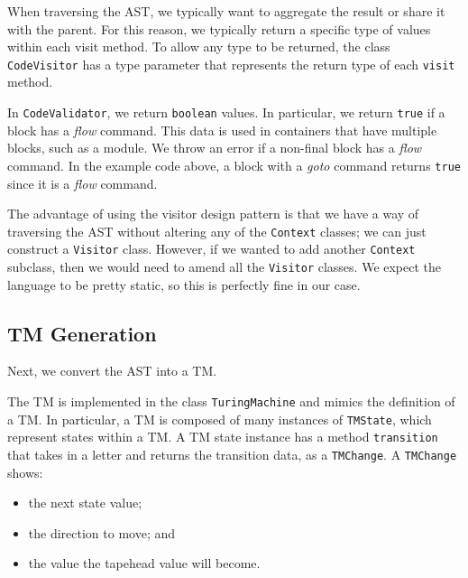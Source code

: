 When traversing the AST, we typically want to aggregate the result or share it with the parent. For this reason, we typically return a specific type of values within each visit method. To allow any type to be returned, the class \texttt{CodeVisitor} has a type parameter that represents the return type of each \texttt{visit} method.

In \texttt{CodeValidator}, we return \texttt{boolean} values. In particular, we return \texttt{true} if a block has a \textit{flow} command. This data is used in containers that have multiple blocks, such as a module. We throw an error if a non-final block has a \textit{flow} command. In the example code above, a block with a \textit{goto} command returns \texttt{true} since it is a \textit{flow} command. 


The advantage of using the visitor design pattern is that we have a way of traversing the AST without altering any of the \texttt{Context} classes; we can just construct a \texttt{Visitor} class. However, if we wanted to add another \texttt{Context} subclass, then we would need to amend all the \texttt{Visitor} classes. We expect the language to be pretty static, so this is perfectly fine in our case.


\subsection{TM Generation}
Next, we convert the AST into a TM. 

The TM is implemented in the class \texttt{TuringMachine} and mimics the definition of a TM. In particular, a TM is composed of many instances of \texttt{TMState}, which represent states within a TM. A TM state instance has a method \texttt{transition} that takes in a letter and returns the transition data, as a \texttt{TMChange}. A \texttt{TMChange} shows:
\begin{itemize}
    \item the next state value;
    \item the direction to move; and
    \item the value the tapehead value will become.
\end{itemize}

